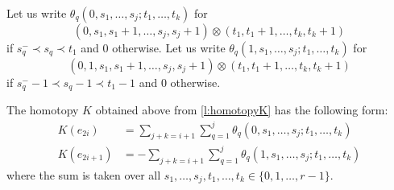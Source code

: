 \begin{definition}
	Let us write $\theta_q(0,s_1,\ldots,s_j;t_1,\ldots,t_k)$ for
	\[(0,s_1,s_1+1,\ldots,s_j,s_j+1)\otimes (t_1,t_1+1,\ldots,t_k,t_k+1)\]
	if $s_q^-\prec s_q\prec t_1$ and $0$ otherwise. Let us write $\theta_q(1,s_1,\ldots,s_j;t_1,\ldots,t_k)$ for
	\[(0,1,s_1,s_1+1,\ldots,s_j,s_j+1)\otimes (t_1,t_1+1,\ldots,t_k,t_k+1)\]
	if $s_q^--1\prec s_q-1\prec t_1-1$ and $0$ otherwise.
\end{definition}

\begin{lemma}\label{l:homotopyK'}
	The homotopy $K$ obtained above from \cref{l:homotopyK} has the following form:
	\begin{align} \label{eq:homotopyK'1}
		K(e_{2i}) &= \sum_{j+k = i+1}{\sum_{q=1}^j{\theta_q(0,s_1,\ldots,s_j;t_1,\ldots,t_k)}} \\ \label{eq:homotopyK'2}
		K(e_{2i+1}) &= -\sum_{j+k = i+1}{\sum_{q=1}^j{\theta_q(1,s_1,\ldots,s_j;t_1,\ldots,t_k)}}
	\end{align}
	where the sum is taken over all $s_1,\ldots,s_j,t_1,\ldots,t_k\in \{0,1,\ldots,r-1\}$.
\end{lemma}


